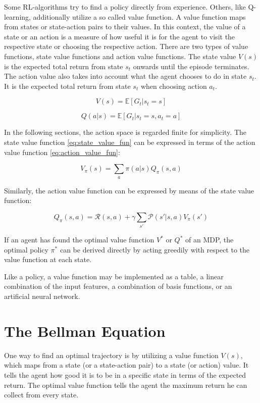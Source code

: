 Some RL-algorithms try to find a policy directly from experience. Others, like Q-learning, additionally utilize a so called value function. A value function maps from states or state-action pairs to their values. In this context, the value of a state or an action is a measure of how useful it is for the agent to visit the respective state or choosing the respective action. There are two types of value functions, state value functions and action value functions. The state value $V(s)$ is the expected total return from state $s_t$ onwards until the episode terminates. The action value also takes into account what the agent chooses to do in state $s_t$. It is the expected total return from state $s_t$ when choosing action $a_t$.

\begin{equation}
V(s) = \mathbb{E}[G_t|s_t=s]
\label{eq:state_value_fun}
\end{equation}

\begin{equation}
Q(a|s) = \mathbb{E}[G_t|s_t=s,a_t=a]
\label{eq:action_value_fun}
\end{equation}

In the following sections, the action space is regarded finite for simplicity.
The state value function \ref{eq:state_value_fun} can be expressed in terms of the action value function \ref{eq:action_value_fun}:

\begin{equation}
V_\pi(s) = \sum_{a}\pi(a|s)Q_\pi(s,a)
\label{eq:state_value_function_with_q}
\end{equation}

Similarly, the action value function can be expressed by means of the state value function:

\begin{equation}
Q_\pi(s,a)=\mathcal{R}(s,a)+\gamma \sum_{s'}\mathcal{P}(s'|s,a)V_\pi(s')
\label{eq:action_value_function_with_v}
\end{equation}

If an agent has found the optimal value function $V^*$ or $Q^*$ of an MDP, the optimal policy $\pi^*$ can be derived directly by acting greedily with respect to the value function at each state.

Like a policy, a value function may be implemented as a table, a linear combination of the input features, a combination of basis functions, or an artificial neural network.

\section{The Bellman Equation}
\label{sec:Bellman_Equation}
One way to find an optimal trajectory is by utilizing a value function $V(s)$, which maps from a state (or a state-action pair) to a state (or action) value. It tells the agent how good it is to be in a specific state in terms of the expected return. The optimal value function tells the agent the maximum return he can collect from every state.

